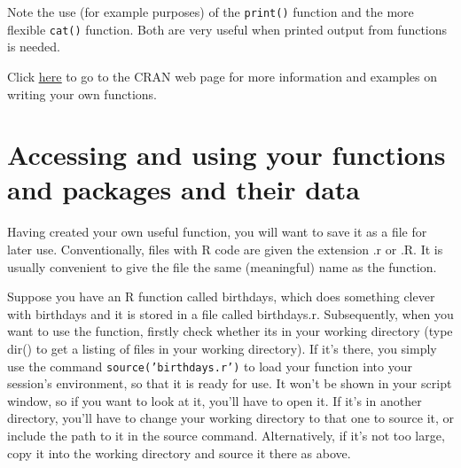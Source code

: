 \documentclass[titlepage]{book}\usepackage{knitr}
\begin{document}
\begin{knitrout}
\color{fgcolor}\begin{kframe}
\begin{alltt}

 \hlkwb{<-} \hlstd{(}\hlstd{,} \hlstd{=}\hlstd{)\{}
  \hlstd{(}  \hlstd{)}

  \hlopt{*}
\hlstd{\}}
 \hlkwb{<-} \hlstd{(}\hlstd{(}\hlopt{:}\hlstd{,}\hlstd{,} \hlopt{:}\hlstd{)}
           
  \hlstd{=}\hlstd{)}      
\end{alltt}
\end{kframe}
\end{knitrout}

Note the use (for example purposes) of the \texttt{print()} function and the more flexible \texttt{cat()} function.  Both are very useful when printed output from functions is needed.

Click \href{http://cran.r-project.org/doc/manuals/R-intro.html\#Writing-your-own-functions}{\underline{here}} to go to the CRAN web page for more information and examples on writing your own functions.


\section{Accessing and using your functions and packages and their data}
Having created your own useful function, you will want to save it as a file for later use.  Conventionally, files with R code are given the extension .r or .R.  It is usually convenient to give the file the same (meaningful) name as the function.

Suppose you have an R function called birthdays, which does something clever with birthdays and it is stored in a file called birthdays.r.  Subsequently, when you want to use the function, firstly check whether its in your working directory (type dir() to get a listing of files in your working directory). If it's there, you simply use the command \texttt{source('birthdays.r')} to load your function into your session's environment, so that it is ready for use. It won't be shown in your script window, so if you want to look at it, you'll have to open it. If it's in another directory, you'll have to change your working directory to that one to source it, or include the path to it in the source command.  Alternatively, if it's not too large, copy it into the working directory and source it there as above.
\end{document}

